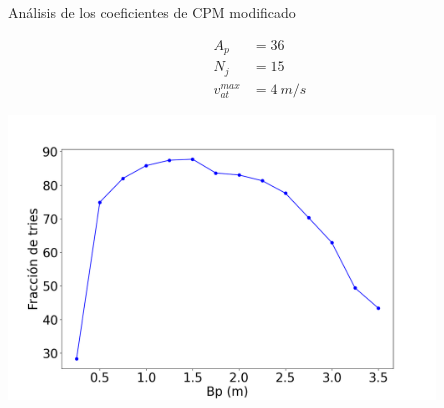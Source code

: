 \begin{frame}{Análisis de los coeficientes de CPM modificado}
    \begin{center}
        \begin{minipage}{0.15\textwidth}
            \begin{equation*}
                \begin{aligned}
                    A_p &= 36 \\
                    N_j &= 15 \\
                    v_{at}^{max} &= 4\ m/s
                \end{aligned}
            \end{equation*}
        \end{minipage}
        \begin{minipage}{0.80\textwidth}
            \hfill\includegraphics[width=0.85\textwidth]{pic/05-resultados/r7}
        \end{minipage}
    \end{center}
    \footnotesize{}
\end{frame}

